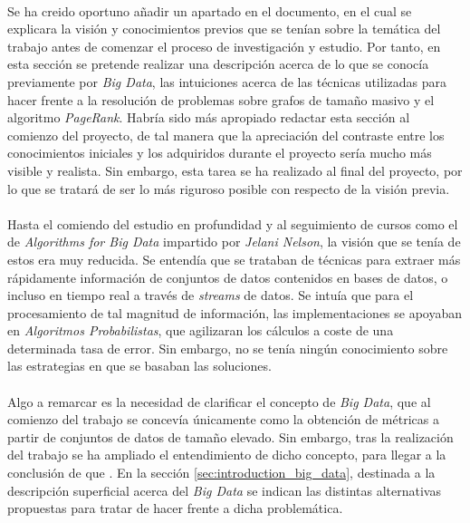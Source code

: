 \documentclass{subfiles}
\begin{document}
      \paragraph{}
      Se ha creido oportuno añadir un apartado en el documento, en el cual se explicara la visión y conocimientos previos que se tenían sobre la temática del trabajo antes de comenzar el proceso de investigación y estudio. Por tanto, en esta sección se pretende realizar una descripción acerca de lo que se conocía previamente por \emph{Big Data}, las intuiciones acerca de las técnicas utilizadas para hacer frente a la resolución de problemas sobre grafos de tamaño masivo y el algoritmo \emph{PageRank}. Habría sido más apropiado redactar esta sección al comienzo del proyecto, de tal manera que la apreciación del contraste entre los conocimientos iniciales y los adquiridos durante el proyecto sería mucho más visible y realista. Sin embargo, esta tarea se ha realizado al final del proyecto, por lo que se tratará de ser lo más riguroso posible con respecto de la visión previa.

      \paragraph{}
      Hasta el comiendo del estudio en profundidad y al seguimiento de cursos como el de \emph{Algorithms for Big Data} \cite{bigdata2015jelani} impartido por \emph{Jelani Nelson}, la visión que se tenía de estos era muy reducida. Se entendía que se trataban de técnicas para extraer más rápidamente información de conjuntos de datos contenidos en bases de datos, o incluso en tiempo real a través de \emph{streams} de datos. Se intuía que para el procesamiento de tal magnitud de información, las implementaciones se apoyaban en \emph{Algoritmos Probabilistas}, que agilizaran los cálculos a coste de una determinada tasa de error. Sin embargo, no se tenía ningún conocimiento sobre las estrategias en que se basaban las soluciones.

      \paragraph{}
      Algo a remarcar es la necesidad de clarificar el concepto de \emph{Big Data}, que al comienzo del trabajo se concevía únicamente como la obtención de métricas a partir de conjuntos de datos de tamaño elevado. Sin embargo, tras la realización del trabajo se ha ampliado el entendimiento de dicho concepto, para llegar a la conclusión de que . En la sección \ref{sec:introduction_big_data}, destinada a la descripción superficial acerca del \emph{Big Data} se indican las distintas alternativas propuestas para tratar de hacer frente a dicha problemática.
\end{document}
